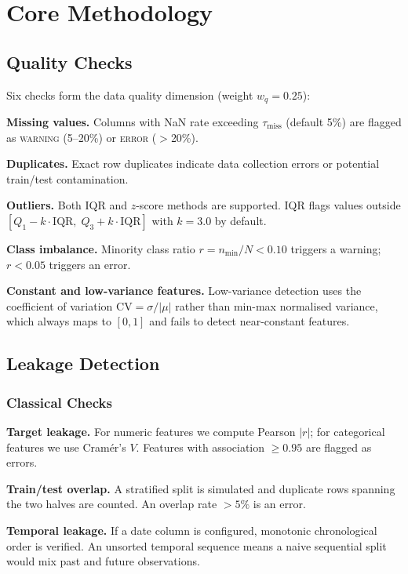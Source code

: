 \documentclass[11pt]{article}
\begin{document}
\section{Core Methodology}
\label{sec:methodology}

\subsection{Quality Checks}

Six checks form the data quality dimension (weight $w_q = 0.25$):

\textbf{Missing values.}  Columns with NaN rate exceeding $\tau_{\text{miss}}$
(default 5\%) are flagged as \textsc{warning} (5--20\%) or \textsc{error}
($>$20\%).

\textbf{Duplicates.}  Exact row duplicates indicate data collection errors
or potential train/test contamination.

\textbf{Outliers.}  Both IQR and $z$-score methods are supported.  IQR
flags values outside $[Q_1 - k \cdot \text{IQR},\; Q_3 + k \cdot \text{IQR}]$
with $k=3.0$ by default.

\textbf{Class imbalance.}  Minority class ratio $r = n_{\min}/N < 0.10$
triggers a warning; $r < 0.05$ triggers an error.

\textbf{Constant and low-variance features.}  Low-variance detection uses the
coefficient of variation $\text{CV} = \sigma/|\mu|$ rather than min-max
normalised variance, which always maps to $[0,1]$ and fails to detect
near-constant features.

\subsection{Leakage Detection}

\subsubsection{Classical Checks}

\textbf{Target leakage.}  For numeric features we compute Pearson $|r|$; for
categorical features we use Cram\'er's $V$.  Features with association
$\ge 0.95$ are flagged as errors.

\textbf{Train/test overlap.}  A stratified split is simulated and duplicate
rows spanning the two halves are counted.  An overlap rate $>5\%$ is an error.

\textbf{Temporal leakage.}  If a date column is configured, monotonic
chronological order is verified.  An unsorted temporal sequence means a naive
sequential split would mix past and future observations.
\end{document}
